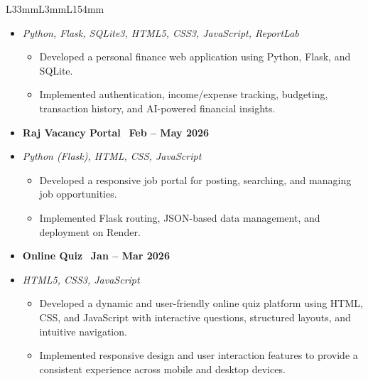 \documentclass[10pt]{article}
\begin{document}
{\begin{tabular}{L{33mm}L{3mm}L{154mm}}
{\begin{itemize}[topsep=2pt, itemsep=2pt, parsep=0pt]
\item[{}] \textit{Python, Flask, SQLite3, HTML5, CSS3, JavaScript, ReportLab}
\begin{itemize}[topsep=1pt, itemsep=1pt, parsep=0pt]
    \item Developed a personal finance web application using Python, Flask, and SQLite.
    \item Implemented authentication, income/expense tracking, budgeting, transaction history, and AI-powered financial insights.
\end{itemize}

\vspace{1mm}


   \item \textbf{Raj Vacancy Portal}~%
\href{https://raj-vacancy-portal.onrender.com}{\color{black}\faExternalLink}
\hfill \textbf{Feb -- May 2026}

\item[{}] \textit{Python (Flask), HTML, CSS, JavaScript}
\begin{itemize}[topsep=1pt, itemsep=1pt, parsep=0pt]
    \item Developed a responsive job portal for posting, searching, and managing job opportunities.
    \item Implemented Flask routing, JSON-based data management, and deployment on Render.
\end{itemize}

\vspace{1mm}

    \item \textbf{Online Quiz}~%
    \href{https://rajraushankumar.github.io/Quiz-Project/}{\color{black} \faExternalLink}
    \hfill \textbf{Jan -- Mar 2026}

    \item[{}] \textit{HTML5, CSS3, JavaScript}
    \begin{itemize}[topsep=1pt, itemsep=1pt, parsep=0pt]
        \item Developed a dynamic and user-friendly online quiz platform using HTML, CSS, and JavaScript with interactive questions, structured layouts, and intuitive navigation.
        \item Implemented responsive design and user interaction features to provide a consistent experience across mobile and desktop devices.
    \end{itemize}

\end{itemize}
}


\end{tabular}}
\end{document}
